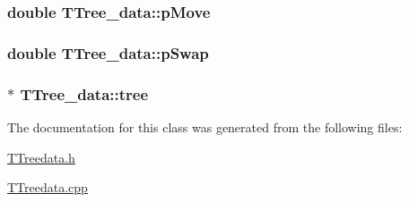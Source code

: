 \subsubsection[{p\+Move}]{\setlength{\rightskip}{0pt plus 5cm}double T\+Tree\+\_\+data\+::p\+Move\hspace{0.3cm}{\ttfamily [private]}}\label{classTTree__data_a45c965402cccc4fd9a4cfcffd3fb991f}
\hypertarget{classTTree__data_a14ad1213b452c13d7385fbf6f74e1fcf}{}
\subsubsection[{p\+Swap}]{\setlength{\rightskip}{0pt plus 5cm}double T\+Tree\+\_\+data\+::p\+Swap\hspace{0.3cm}{\ttfamily [private]}}\label{classTTree__data_a14ad1213b452c13d7385fbf6f74e1fcf}
\hypertarget{classTTree__data_adb6a018eb7424a0205ff478287dffab5}{}
\subsubsection[{tree}]{$\ast$ T\+Tree\+\_\+data\+::tree\hspace{0.3cm}{\ttfamily [private]}}\label{classTTree__data_adb6a018eb7424a0205ff478287dffab5}


The documentation for this class was generated from the following files\+:\begin{DoxyCompactItemize}
\item 
\hyperlink{TTreedata_8h}{T\+Treedata.\+h}\item 
\hyperlink{TTreedata_8cpp}{T\+Treedata.\+cpp}\end{DoxyCompactItemize}

